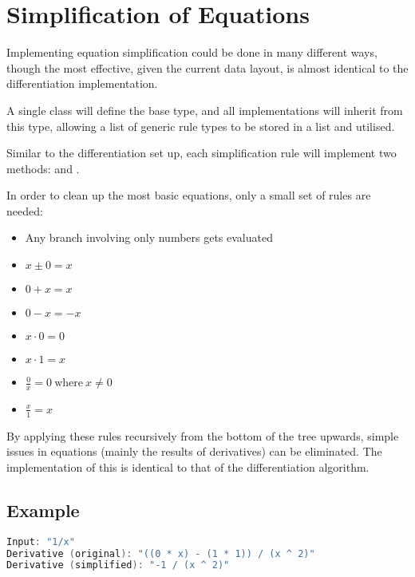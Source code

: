 \documentclass[12pt]{article}
\begin{document}
\pagebreak

\section{Simplification of Equations}

Implementing equation simplification could be done in many different ways, though the most effective, given the current data layout, is almost identical to the differentiation implementation.

A single class will define the base  type, and all implementations will inherit from this type, allowing a list of generic rule types to be stored in a list and utilised.

Similar to the differentiation set up, each simplification rule will implement two methods:  and .

In order to clean up the most basic equations, only a small set of rules are needed:

\begin{itemize}
	\item Any branch involving only numbers gets evaluated
	\item $x \pm 0 = x$
	\item $0 + x = x$
	\item $0 - x = -x$
	\item $x \cdot 0 = 0$
	\item $x \cdot 1 = x$
	\item $\frac{0}{x} = 0 \ \text{where} \ x \neq 0$
	\item $\frac{x}{1} = x$
\end{itemize}

\vspace{0.25cm}

By applying these rules recursively from the bottom of the tree upwards, simple issues in equations (mainly the results of derivatives) can be eliminated. The implementation of this is identical to that of the differentiation algorithm.

\subsection{Example}

\begin{lstlisting}[language=C++]
Input: "1/x"
Derivative (original): "((0 * x) - (1 * 1)) / (x ^ 2)"
Derivative (simplified): "-1 / (x ^ 2)"
\end{lstlisting}
\end{document}
